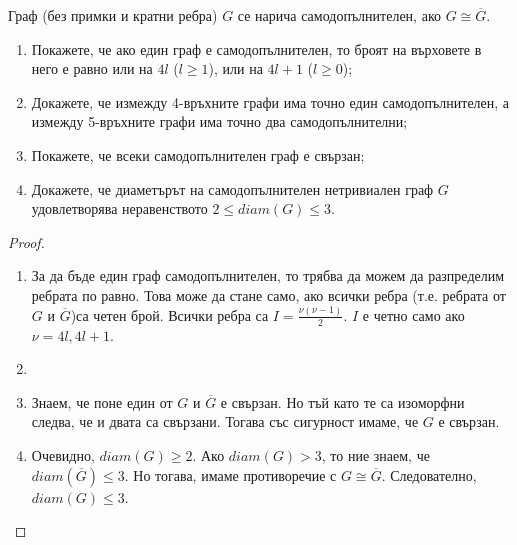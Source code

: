 \begin{problem} %
  Граф (без примки и кратни ребра) $G$ се нарича самодопълнителен, ако $G\cong\overline{G}$.
  \begin{enumerate}
  \item
    Покажете, че ако един граф е самодопълнителен, то броят на върховете в него е равно или на $4l$ ($l\geq 1$), или на $4l+1$ ($l\geq 0$);
  \item
    Докажете, че измежду 4-връхните графи има точно един самодопълнителен, а измежду 5-връхните графи има точно два самодопълнителни;
  \item
    Покажете, че всеки самодопълнителен граф е свързан;
  \item
    Докажете, че диаметърът на самодопълнителен нетривиален граф $G$ удовлетворява неравенството $2\leq diam(G) \leq 3$.
\end{enumerate}
\end{problem}
\begin{proof}
  \begin{enumerate}
  \item
    За да бъде един граф самодопълнителен, то трябва да можем да разпределим ребрата по равно.
    Това може да стане само, ако всички ребра (т.е. ребрата от $G$ и $\overline{G}$)са четен брой.
    Всички ребра са $I = \frac{\nu(\nu-1)}{2}$. $I$ е четно само ако $\nu = 4l,4l+1$.
  \item
  \item
    Знаем, че поне един от $G$ и $\overline{G}$ е свързан.
    Но тъй като те са изоморфни следва, че и двата са свързани.
    Тогава със сигурност имаме, че $G$ е свързан.
  \item
    Очевидно, $diam(G)\geq 2$. Ако $diam(G) > 3$, то ние знаем, че $diam(\overline{G})\leq 3$.
    Но тогава, имаме противоречие с $G\cong\overline{G}$.
    Следователно, $diam(G)\leq 3$.
  \end{enumerate}
\end{proof}


